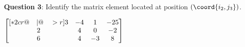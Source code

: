\documentclass[12pt,tiks]{article}
\begin{document}
    \newpage
    \clearpage
    \thispagestyle{fancy}
    
    \begin{minipage}[t][.7in][t]{3in}\RaggedRight
    \-\vspace*{.1in}
    \textbf{Question 3}: Identify the matrix element located at position $(\coord{i_2,j_3})$.
    
    \-\vspace*{.1in}
    
         $
            \begin{bmatrix}[*2cr@{\quad}|@{\quad}>{\color{black}}r]
              3 & -4 & 1 & -25 \\
              2 & 4 & 0 & -2 \\
              6 & 4 & -3 & 8
            \end{bmatrix}
        $
    \end{minipage}
    
    \hspace{.1in}\vspace{1in}
    
\end{document}
